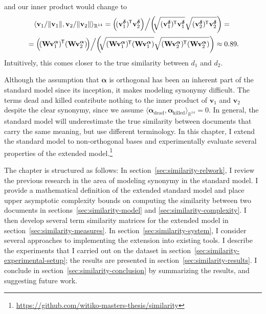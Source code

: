 \documentclass[
  digital, %
  notable, %
  lof,     %
  lot,     %
  nopalatino, color
]{fithesis3}
\newif\ifthesis\thesistrue
\newif\ifreview\reviewfalse
\newcommand*{\tran}{^{\mkern-1.5mu\mathsf{T}}}
\let\note=\footnote
\begin{document}
and our inner product would change to
\begin{multline*}
  \langle\mathbf v_1/\Vert \mathbf v_1\Vert, \mathbf v_2/\Vert\mathbf v_2\Vert\rangle_{\mathbb{R}^{14}}
  = \Big(\!(\mathbf v_1^{\bm\delta})\tran \mathbf v_2^{\bm\delta}\Big) \Big/\!
    \left(\!\!\sqrt{\mathbf (\mathbf v_1^{\bm\delta})\tran \mathbf
    v_1^{\bm\delta}}\sqrt{\mathbf (\mathbf v_2^{\bm\delta})\tran \mathbf
    v_2^{\bm\delta}}\right) ={}\\
  {}= \Big(\!(\mathbf W\mathbf v_1^{\bm\alpha})\tran (\mathbf W\mathbf v_2^{\bm\alpha})\!\Big) \Big/\!
    \left(\!\!\sqrt{\mathbf (\mathbf W\mathbf v_1^{\bm\alpha})\tran (\mathbf W\mathbf
    v_1^{\bm\alpha})}\sqrt{(\mathbf W\mathbf v_2^{\bm\alpha})\tran (\mathbf W\mathbf
    v_2^{\bm\alpha})}\right)\approx0.89.
\end{multline*}
Intuitively, this comes closer to the true similarity between $d_1$ and $d_2$.

Although the assumption that $\bm\alpha$ is orthogonal has been an inherent
part of the standard model since its inception, it makes modeling synonymy
difficult. The terms dead and killed contribute nothing to the inner product of
$\mathbf v_1$ and $\mathbf v_2$ despite the clear synonymy, since we assume
$\langle \bm\alpha_{\text{dead}}, \bm\alpha_{\text{killed}}\rangle_{\mathbb
R^{14}}=0$. In general, the standard model will underestimate the true
similarity between documents that carry the same meaning, but use different
terminology. In this \ifthesis chapter\else work\fi, I extend the standard
model to non-orthogonal bases and experimentally
evaluate several properties of the extended model.\note{%
\ifreview
A link to the research data will be disclosed in the camera-ready
version of the paper.
\else
\url{https://github.com/witiko-masters-thesis/similarity}
\fi}

The chapter is structured as follows: In section~\ref{sec:similarity-relwork}, I
review the previous research in the area of modeling synonymy in the standard
model. I provide a mathematical definition of the extended standard model and
place upper asymptotic complexity bounds on computing the similarity between two
documents in sections~\ref{sec:similarity-model} and
\ref{sec:similarity-complexity}. I then develop several term similarity matrices
for the extended model in section~\ref{sec:similarity-measures}. In
section~\ref{sec:similarity-system}, I consider several approaches to
implementing the extension into existing tools. I describe the experiments that
I carried out on the dataset in
section~\ref{sec:similarity-experimental-setup}; the results are presented in
section~\ref{sec:similarity-results}. I conclude in
section~\ref{sec:similarity-conclusion} by summarizing the results, and
suggesting future work.
\end{document}
